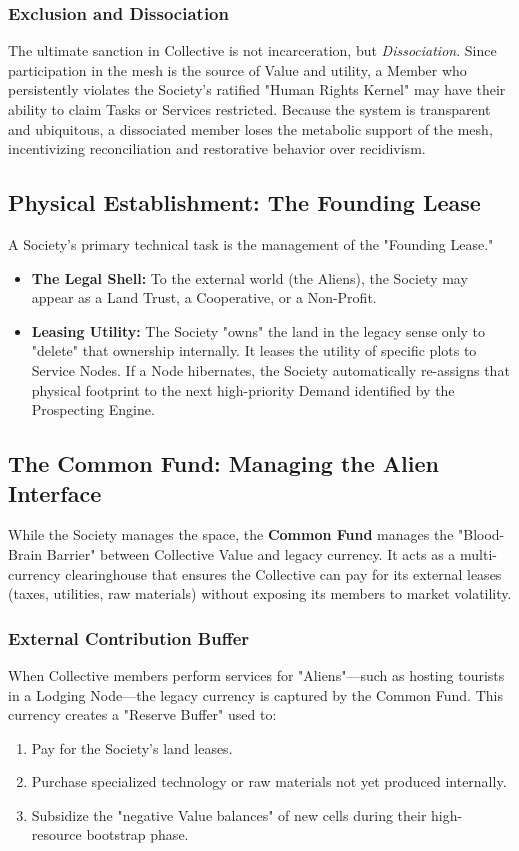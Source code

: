 \subsubsection{Exclusion and Dissociation}
The ultimate sanction in Collective is not incarceration, but \textit{Dissociation}. Since participation in the mesh is the source of Value and utility, a Member who persistently violates the Society's ratified "Human Rights Kernel" may have their ability to claim Tasks or Services restricted. Because the system is transparent and ubiquitous, a dissociated member loses the metabolic support of the mesh, incentivizing reconciliation and restorative behavior over recidivism.

\subsection{Physical Establishment: The Founding Lease}
A Society’s primary technical task is the management of the "Founding Lease."
\begin{itemize}[leftmargin=*]
    \item \textbf{The Legal Shell:} To the external world (the Aliens), the Society may appear as a Land Trust, a Cooperative, or a Non-Profit. 
    \item \textbf{Leasing Utility:} The Society "owns" the land in the legacy sense only to "delete" that ownership internally. It leases the utility of specific plots to Service Nodes. If a Node hibernates, the Society automatically re-assigns that physical footprint to the next high-priority Demand identified by the Prospecting Engine.
\end{itemize}

\subsection{The Common Fund: Managing the Alien Interface}
While the Society manages the space, the \textbf{Common Fund} manages the "Blood-Brain Barrier" between Collective Value and legacy currency. It acts as a multi-currency clearinghouse that ensures the Collective can pay for its external leases (taxes, utilities, raw materials) without exposing its members to market volatility.

\subsubsection{External Contribution Buffer}
When Collective members perform services for "Aliens"—such as hosting tourists in a Lodging Node—the legacy currency is captured by the Common Fund. This currency creates a "Reserve Buffer" used to:
\begin{enumerate}
    \item Pay for the Society's land leases.
    \item Purchase specialized technology or raw materials not yet produced internally.
    \item Subsidize the "negative Value balances" of new cells during their high-resource bootstrap phase.
\end{enumerate}

